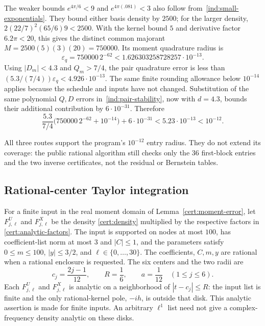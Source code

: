 The weaker bounds $e^{4\pi/6}<9$ and $e^{4\pi(.081)}<3$ also follow
from~\eqref{ind:small-exponentials}.  They bound either basis density by
$2500$; for the larger density,
$2(22/7)^2(65/6)9<2500$.  With the kernel bound $5$ and derivative
factor $6.2\pi<20$, this gives the distinct common majorant
$M=2500(5)(3)(20)=750000$.  Its moment quadrature radius is
\begin{equation}\label{ind:small-rounding-quadrature}
 \varepsilon_q=750000\,2^{-62}
 <1.626303258728257\cdot10^{-13}.
\end{equation}
Using $|D_m|<4.3$ and $Q_m>7/4$, the pair quadrature error is less than
$(5.3/(7/4))\varepsilon_q<4.926\cdot10^{-13}$.
The same finite rounding allowance below $10^{-14}$ applies because the
schedule and inputs have not changed.  Substitution of the same polynomial
$Q,D$ errors in~\eqref{ind:pair-stability}, now with $d=4.3$, bounds their
additional contribution by $6\cdot10^{-31}$.  Therefore
\begin{equation}\label{ind:small-rounding-entry}
 \frac{5.3}{7/4}\bigl(750000\,2^{-62}+10^{-14}\bigr)
       +6\cdot10^{-31}<5.23\cdot10^{-13}<10^{-12}.
\end{equation}

All three routes support the program's $10^{-12}$ entry radius.  They do
not extend its coverage: the public rational algorithm still checks only
the 36 first-block entries and the two inverse certificates, not the
residual or Bernstein tables.

\subsection{Rational-center Taylor integration}\label{ind:taylor}

For a finite input in the real moment domain of Lemma~\ref{cert:moment-error}, let
$F^U_{j,\ell}$ and $F^X_{j,\ell}$ be the density \eqref{cert:density}
multiplied by the respective factors in \eqref{cert:analytic-factors}.
The input is supported on nodes at most $100$, has coefficient-list norm at
most $3$ and $|C|\le1$, and the parameters satisfy
$0\le m\le100$, $|y|\le3/2$, and $\ell\in\{0,\ldots,30\}$.  The coefficients,
$C,m,y$ are rational when a rational enclosure is requested.  The six
centers and the two radii are
\begin{equation}\label{ind:centers}
 c_j=\frac{2j-1}{12},\qquad R=\frac16,\qquad a=\frac1{12}
 \quad(1\le j\le6).
\end{equation}
Each $F^U_{j,\ell}$ and $F^X_{j,\ell}$ is analytic on a neighborhood of
$|t-c_j|\le R$: the input list is finite and the only rational-kernel pole,
$-ih$, is outside that disk.  This analytic assertion is made for finite
inputs.  An arbitrary $\ell^1$ list need not give a complex-frequency
density analytic on these disks.

